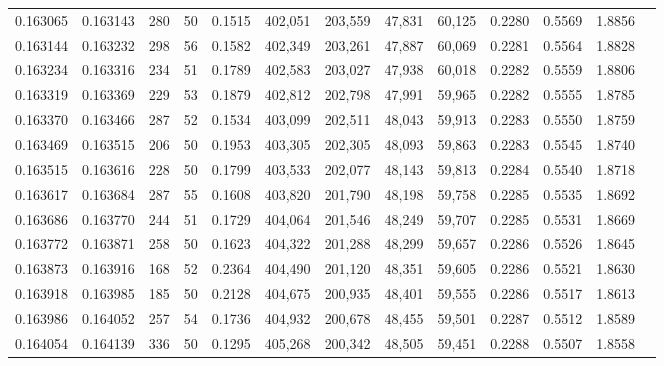 \begin{tabular}{rrrrrrrrrrrrr}
0.163065 & 0.163143 &   280 &  50 &                                     0.1515 & 402,051 & 203,559 &  47,831 &  60,125 & 0.2280 & 0.5569 & 1.8856 \\
0.163144 & 0.163232 &   298 &  56 &                                     0.1582 & 402,349 & 203,261 &  47,887 &  60,069 & 0.2281 & 0.5564 & 1.8828 \\
0.163234 & 0.163316 &   234 &  51 &                                     0.1789 & 402,583 & 203,027 &  47,938 &  60,018 & 0.2282 & 0.5559 & 1.8806 \\
0.163319 & 0.163369 &   229 &  53 &                                     0.1879 & 402,812 & 202,798 &  47,991 &  59,965 & 0.2282 & 0.5555 & 1.8785 \\
0.163370 & 0.163466 &   287 &  52 &                                     0.1534 & 403,099 & 202,511 &  48,043 &  59,913 & 0.2283 & 0.5550 & 1.8759 \\
0.163469 & 0.163515 &   206 &  50 &                                     0.1953 & 403,305 & 202,305 &  48,093 &  59,863 & 0.2283 & 0.5545 & 1.8740 \\
0.163515 & 0.163616 &   228 &  50 &                                     0.1799 & 403,533 & 202,077 &  48,143 &  59,813 & 0.2284 & 0.5540 & 1.8718 \\
0.163617 & 0.163684 &   287 &  55 &                                     0.1608 & 403,820 & 201,790 &  48,198 &  59,758 & 0.2285 & 0.5535 & 1.8692 \\
0.163686 & 0.163770 &   244 &  51 &                                     0.1729 & 404,064 & 201,546 &  48,249 &  59,707 & 0.2285 & 0.5531 & 1.8669 \\
0.163772 & 0.163871 &   258 &  50 &                                     0.1623 & 404,322 & 201,288 &  48,299 &  59,657 & 0.2286 & 0.5526 & 1.8645 \\
0.163873 & 0.163916 &   168 &  52 &                                     0.2364 & 404,490 & 201,120 &  48,351 &  59,605 & 0.2286 & 0.5521 & 1.8630 \\
0.163918 & 0.163985 &   185 &  50 &                                     0.2128 & 404,675 & 200,935 &  48,401 &  59,555 & 0.2286 & 0.5517 & 1.8613 \\
0.163986 & 0.164052 &   257 &  54 &                                     0.1736 & 404,932 & 200,678 &  48,455 &  59,501 & 0.2287 & 0.5512 & 1.8589 \\
0.164054 & 0.164139 &   336 &  50 &                                     0.1295 & 405,268 & 200,342 &  48,505 &  59,451 & 0.2288 & 0.5507 & 1.8558 \\

\end{tabular}
